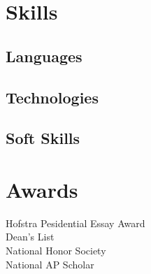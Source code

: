 \documentclass[]{deedy-resume-openfont}
\begin{document}
\begin{minipage}[t]{0.33\textwidth}

\section{Skills}
\subsection{Languages}
\cvtag{\LaTeX}  

\vspace{\topsep}
\subsection{Technologies}

\vspace{\topsep}
\subsection{Soft Skills}
\sectionsep

\section{Awards}
Hofstra Pesidential Essay Award \\
Dean's List \\
National Honor Society \\
National AP Scholar

\end{minipage} 
\end{document}
